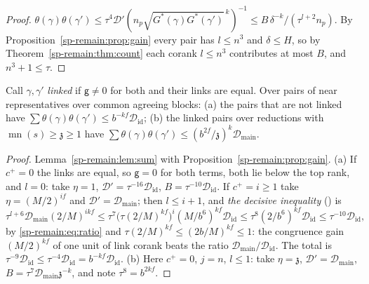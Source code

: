 \begin{proof}
$\theta(\gamma)\theta(\gamma')\le\tau^4\mathcal D'(n_p\sqrt{G^*(\gamma)G^*(\gamma')}^{\,k})^{-1}\le
B\,\delta^{-k}/(\tau^{l+2}n_p)$. By Proposition~\ref{sp-remain:prop:gain} every pair has $l\le n^3$ and
$\delta\le H$, so by Theorem~\ref{sp-remain:thm:count} each corank $l\le n^3$ contributes at most $B$, and
$n^3+1\le\tau$.
\end{proof}

\begin{corollary}\label{sp-remain:cor:pairs}
Call $\gamma,\gamma'$ \emph{linked} if $\mathsf g\ne0$ for both and their links are equal. Over pairs
of near representatives over common agreeing blocks: (a) the pairs that are not linked have
$\sum\theta(\gamma)\theta(\gamma')\le b^{-kf}\mathcal D_{\mathrm{id}}$; (b) the linked pairs over
reductions with $\operatorname{mn}(s)\ge\mathfrak z\ge1$ have $\sum\theta(\gamma)\theta(\gamma')\le
(b^{2f}/\mathfrak z)^k\mathcal D_{\mathrm{main}}$.
\end{corollary}

\begin{proof}
Lemma~\ref{sp-remain:lem:sum} with Proposition~\ref{sp-remain:prop:gain}. (a) If $c^+=0$ the links are
equal, so $\mathsf g=0$ for both terms, both lie below the top rank, and $l=0$: take $\eta=1$,
$\mathcal D'=\tau^{-16}\mathcal D_{\mathrm{id}}$, $B=\tau^{-10}\mathcal D_{\mathrm{id}}$. If $c^+=i\ge1$ take
$\eta=(M/2)^{if}$ and $\mathcal D'=\mathcal D_{\mathrm{main}}$; then $l\le i+1$, and \emph{the decisive
inequality} () is
\[
\tau^{l+6}\mathcal D_{\mathrm{main}}(2/M)^{ikf}\le\tau^7\bigl(\tau(2/M)^{kf}\bigr)^i(M/b^6)^{kf}
\mathcal D_{\mathrm{id}}\le\tau^8(2/b^6)^{kf}\mathcal D_{\mathrm{id}}\le\tau^{-10}\mathcal D_{\mathrm{id}},
\]
by \eqref{sp-remain:eq:ratio} and $\tau(2/M)^{kf}\le(2b/M)^{kf}\le1$: the congruence gain $(M/2)^{kf}$
of one unit of link corank beats the ratio $\mathcal D_{\mathrm{main}}/\mathcal D_{\mathrm{id}}$. The
total is $\tau^{-9}\mathcal D_{\mathrm{id}}\le\tau^{-4}\mathcal D_{\mathrm{id}}=b^{-kf}\mathcal
D_{\mathrm{id}}$. (b) Here $c^+=0$, $j=n$, $l\le1$: take $\eta=\mathfrak z$, $\mathcal D'=\mathcal D_{\mathrm{main}}$,
$B=\tau^7\mathcal D_{\mathrm{main}}\mathfrak z^{-k}$, and note $\tau^8=b^{2kf}$.
\end{proof}

